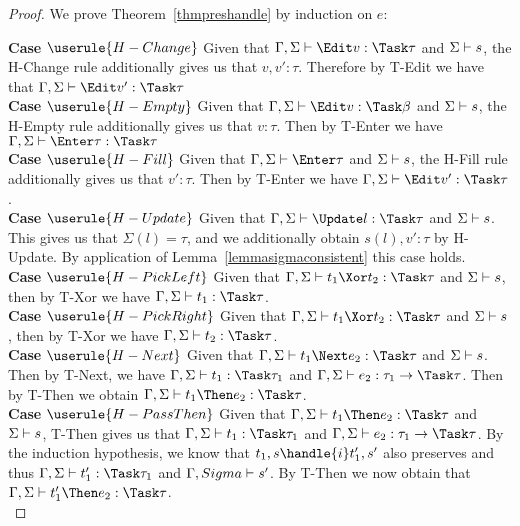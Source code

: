 \begin{proof}
  We prove Theorem~\ref{thmpreshandle} by induction on $e$:

  \noindent\textbf{Case} $\userule{H-Change}$ Given that $\Gamma,\Sigma\infers\Edit v:\Task\tau$ and $\Sigma\vdash s$, the H-Change rule additionally gives us that $v,v':\tau$. Therefore by T-Edit we have that $\Gamma,\Sigma\infers\Edit v':\Task\tau$\\

  \noindent\textbf{Case} $\userule{H-Empty}$ Given that $\Gamma,\Sigma\infers\Edit v:\Task\beta$ and $\Sigma\vdash s$, the H-Empty rule additionally gives us that $v:\tau$. Then by T-Enter we have $\Gamma,\Sigma\infers\Enter \tau:\Task\tau$ \\

  \noindent\textbf{Case} $\userule{H-Fill}$ Given that $\Gamma,\Sigma\infers\Enter\tau$ and $\Sigma\vdash s$, the H-Fill rule additionally gives us that $v':\tau$. Then by T-Enter we have $\Gamma,\Sigma\infers \Edit v':\Task\tau$.\\

  \noindent\textbf{Case} $\userule{H-Update}$ Given that $\Gamma,\Sigma\infers\Update l:\Task\tau$ and $\Sigma\vdash s$. This gives us that $\Sigma(l)=\tau$, and we additionally obtain $s(l),v':\tau$ by H-Update. By application of Lemma~\ref{lemmasigmaconsistent} this case holds.\\

  \noindent\textbf{Case} $\userule{H-PickLeft}$ Given that $\Gamma,\Sigma\infers t_1\Xor t_2:\Task\tau$ and $\Sigma\vdash s$, then by T-Xor we have $\Gamma,\Sigma\infers t_1:\Task \tau$.\\

  \noindent\textbf{Case} $\userule{H-PickRight}$ Given that $\Gamma,\Sigma\infers t_1\Xor t_2:\Task\tau$ and $\Sigma\vdash s$, then by T-Xor we have $\Gamma,\Sigma\infers t_2:\Task \tau$. \\

  \noindent\textbf{Case} $\userule{H-Next}$ Given that $\Gamma,\Sigma\infers t_1\Next e_2 :\Task\tau$ and $\Sigma\vdash s$. Then by T-Next, we have $\Gamma,\Sigma\infers t_1:\Task\tau_1$ and $\Gamma,\Sigma\infers e_2:\tau_1\to\Task\tau$. Then by T-Then we obtain $\Gamma,\Sigma\infers t_1\Then e_2:\Task\tau$.\\

  \noindent\textbf{Case} $\userule{H-PassThen}$ Given that $\Gamma,\Sigma\infers t_1\Then e_2:\Task\tau$ and $\Sigma\vdash s$, T-Then gives us that $\Gamma,\Sigma\infers t_1:\Task\tau_1$ and $\Gamma,\Sigma\infers e_2:\tau_1\to\Task\tau$. By the induction hypothesis, we know that $t_1,s\handle{i}t_1',s'$ also preserves and thus $\Gamma,\Sigma\infers t_1':\Task\tau_1$ and $\Gamma,Sigma\vdash s'$. By T-Then we now obtain that $\Gamma,\Sigma\infers t_1'\Then e_2:\Task\tau$. \\


\end{proof}
